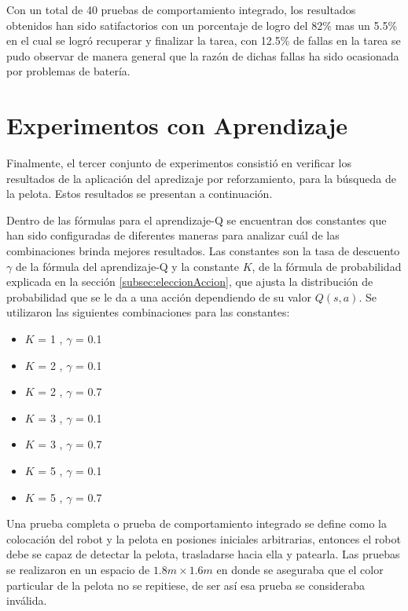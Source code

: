 Con un total de 40 pruebas de comportamiento integrado, los resultados obtenidos han sido satifactorios con un porcentaje de logro del 82\% mas un 5.5\% en el cual se logró recuperar y finalizar la tarea, con 12.5\% de fallas en la tarea se pudo observar de manera general que la razón de dichas fallas ha sido ocasionada por problemas de batería.



\section{Experimentos con Aprendizaje}\label{sec:experimentosAprend}

Finalmente, el tercer conjunto de experimentos consistió en verificar los resultados de la aplicaci\'on del apredizaje por reforzamiento, para la búsqueda de la pelota. Estos resultados se presentan a continuaci\'on.

Dentro de las fórmulas para el aprendizaje-Q se encuentran dos constantes que han sido configuradas de diferentes maneras para analizar cuál de las combinaciones brinda mejores resultados. Las constantes son la tasa de descuento $\gamma$ de la fórmula del aprendizaje-Q y la constante $K$, de la fórmula de probabilidad explicada en la secci\'on \ref{subsec:eleccionAccion}, que ajusta la distribución de probabilidad que se le da a una acción dependiendo de su valor $Q(s,a)$. Se utilizaron las siguientes combinaciones para las constantes:

\begin{itemize}
\item $K$ = 1 , $\gamma$ = 0.1
\item $K$ = 2 , $\gamma$ = 0.1 
\item $K$ = 2 , $\gamma$ = 0.7
\item $K$ = 3 , $\gamma$ = 0.1
\item $K$ = 3 , $\gamma$ = 0.7
\item $K$ = 5 , $\gamma$ = 0.1
\item $K$ = 5 , $\gamma$ = 0.7
   
\end{itemize}

Una prueba completa o prueba de comportamiento integrado se define como la colocaci\'on del robot y la pelota en posiones iniciales arbitrarias, entonces el robot debe se capaz de detectar la pelota, trasladarse hacia ella y patearla. Las pruebas se realizaron en un espacio de $1.8 m \times 1.6 m$
en donde se aseguraba que el color particular de la pelota no se repitiese, de ser así esa prueba se consideraba inválida.

